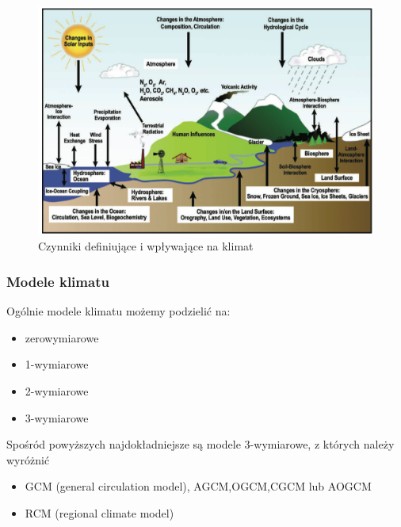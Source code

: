 \documentclass{beamer}
\begin{document}
\begin{frame}
	\frametitle{}
	\begin{figure}[h]
		\begin{center}
			\includegraphics[width=0.7\linewidth]{images/Figure1}
			\caption{Czynniki definiujące i wpływające na klimat}
		\end{center}
	\end{figure}
\end{frame}


\begin{frame}
	\frametitle{Modele klimatu}
	Ogólnie modele klimatu możemy podzielić na:
	\begin{itemize}
		\item zerowymiarowe
		\item 1-wymiarowe
		\item 2-wymiarowe
		\item 3-wymiarowe
	\end{itemize}
	\vspace{0.5cm}
	Spośród powyższych najdokładniejsze są modele 3-wymiarowe, z których należy wyróżnić
	\begin{itemize}
		\item GCM (general circulation model), AGCM,OGCM,CGCM lub AOGCM
		\item RCM (regional climate model)
	\end{itemize}
	
\end{frame}
\end{document}
